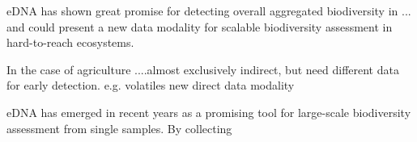 eDNA has shown great promise for detecting overall aggregated biodiversity in ... and could present a new data modality for scalable biodiversity assessment in hard-to-reach ecosystems.


In the case of agriculture ....almost exclusively indirect, but need different  data for early detection. e.g. volatiles new direct data modality



eDNA has emerged in recent years as a promising tool for large-scale biodiversity assessment from single samples. By collecting 

